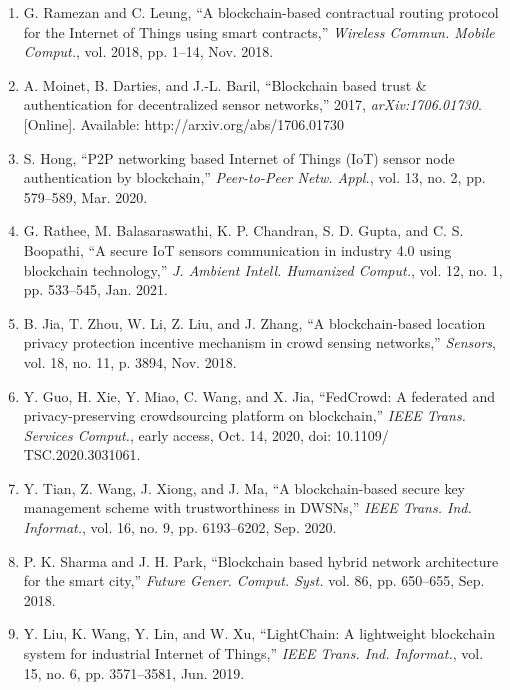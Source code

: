 \documentclass{article} %
\begin{document}
\begin{enumerate}
\item  G. Ramezan and C. Leung, ``A blockchain-based contractual routing protocol for the Internet of Things using smart contracts,'' \textit{Wireless Commun. Mobile Comput.}, vol. 2018, pp. 1--14, Nov. 2018.

\item  A. Moinet, B. Darties, and J.-L. Baril, ``Blockchain based trust \& authentication for decentralized sensor networks,'' 2017, \textit{arXiv:1706.01730}. [Online]. Available: http://arxiv.org/abs/1706.01730

\item  S. Hong, ``P2P networking based Internet of Things (IoT) sensor node authentication by blockchain,'' \textit{Peer-to-Peer Netw. Appl.}, vol. 13, no. 2, pp. 579--589, Mar. 2020.

\item  G. Rathee, M. Balasaraswathi, K. P. Chandran, S. D. Gupta, and C. S. Boopathi, ``A secure IoT sensors communication in industry 4.0 using blockchain technology,'' \textit{J. Ambient Intell. Humanized Comput.}, vol. 12, no. 1, pp. 533--545, Jan. 2021.

\item  B. Jia, T. Zhou, W. Li, Z. Liu, and J. Zhang, ``A blockchain-based location privacy protection incentive mechanism in crowd sensing networks,'' \textit{Sensors}, vol. 18, no. 11, p. 3894, Nov. 2018.

\item  Y. Guo, H. Xie, Y. Miao, C. Wang, and X. Jia, ``FedCrowd: A federated and privacy-preserving crowdsourcing platform on blockchain,'' \textit{IEEE Trans. Services Comput.}, early access, Oct. 14, 2020, doi: 10.1109/ TSC.2020.3031061.

\item  Y. Tian, Z. Wang, J. Xiong, and J. Ma, ``A blockchain-based secure key management scheme with trustworthiness in DWSNs,'' \textit{IEEE Trans. Ind. Informat.}, vol. 16, no. 9, pp. 6193--6202, Sep. 2020.

\item  P. K. Sharma and J. H. Park, ``Blockchain based hybrid network architecture for the smart city,'' \textit{Future Gener. Comput. Syst. }vol. 86, pp. 650--655, Sep. 2018.

\item  Y. Liu, K. Wang, Y. Lin, and W. Xu, ``LightChain: A lightweight blockchain system for industrial Internet of Things,'' \textit{IEEE Trans. Ind. Informat.}, vol. 15, no. 6, pp. 3571--3581, Jun. 2019.


\end{enumerate}
\end{document}

